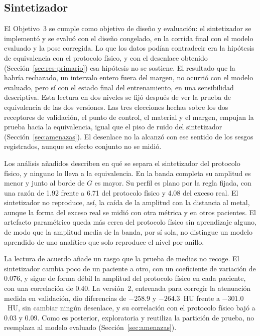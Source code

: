 \subsection{Sintetizador}

El Objetivo~3 se cumple como objetivo de diseño y evaluación: el sintetizador se implementó y se evaluó con el diseño congelado, en la corrida final con el modelo evaluado y la pose corregida. Lo que los datos podían contradecir era la hipótesis de equivalencia con el protocolo físico, y con el desenlace obtenido (Sección~\ref{sec:res-primario}) esa hipótesis no se sostiene. El resultado que la habría rechazado, un intervalo entero fuera del margen, no ocurrió con el modelo evaluado, pero sí con el estado final del entrenamiento, en una sensibilidad descriptiva. Esta lectura en dos niveles se fijó después de ver la prueba de equivalencia de las dos versiones. Las tres elecciones hechas sobre los dos receptores de validación, el punto de control, el material y el margen, empujan la prueba hacia la equivalencia, igual que el piso de ruido del sintetizador (Sección~\ref{sec:amenazas}). El desenlace no la alcanzó con ese sentido de los sesgos registrados, aunque su efecto conjunto no se midió.

Los análisis añadidos describen en qué se separa el sintetizador del protocolo físico, y ninguno lo lleva a la equivalencia. En la banda completa su amplitud es menor y junto al borde de $G$ es mayor. Su perfil es plano por la regla fijada, con una razón de 1.92 frente a 6.71 del protocolo físico y 4.08 del exceso real. El sintetizador no reproduce, así, la caída de la amplitud con la distancia al metal, aunque la forma del exceso real se midió con otra métrica y en otros pacientes. El artefacto paramétrico queda más cerca del protocolo físico sin aprendizaje alguno, de modo que la amplitud media de la banda, por sí sola, no distingue un modelo aprendido de uno analítico que solo reproduce el nivel por anillo.

La lectura de acuerdo añade un rasgo que la prueba de medias no recoge. El sintetizador cambia poco de un paciente a otro, con un coeficiente de variación de 0.076, y sigue de forma débil la amplitud del protocolo físico en cada paciente, con una correlación de 0.40. La versión~2, entrenada para corregir la atenuación medida en validación, dio diferencias de $-258.9$ y $-264.3$~HU frente a $-301.0$~HU, sin cambiar ningún desenlace, y su correlación con el protocolo físico bajó a 0.03 y 0.09. Como es posterior, exploratoria y reutiliza la partición de prueba, no reemplaza al modelo evaluado (Sección~\ref{sec:amenazas}).

